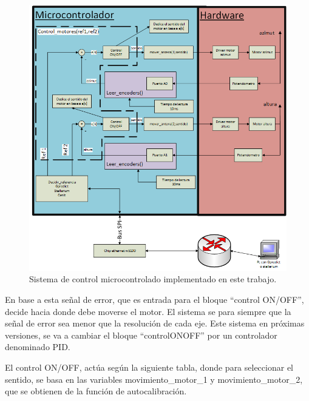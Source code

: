 \begin{figure}[pt]
	\hspace{-30mm}
	\includegraphics{control_realimentado}
	\caption{Sistema de control microcontrolado implementado en este trabajo.}
	\label{fig:sist_control_real}
\end{figure}

 En base a esta señal de error, que es entrada para el bloque ``control ON/OFF'', decide hacia donde debe moverse el motor. El sistema se para siempre que la señal de error sea menor que la resolución de cada eje. Este sistema en próximas versiones, se va a cambiar el bloque ``controlONOFF'' por un controlador denominado PID. 
\vspace{15mm}

 El control ON/OFF, actúa según la siguiente tabla, donde para seleccionar el sentido, se basa en las variables movimiento\_motor\_1 y movimiento\_motor\_2, que se obtienen de la función de autocalibración. 
 

